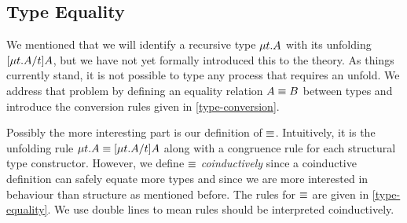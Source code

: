 \subsection{Type Equality}

We mentioned that we will identify a recursive type $\mu{t} . {A}$ with its unfolding $\lbrack{\mu{t} . {A}}/{t}\rbrack{A}$, but we have not yet formally introduced this to the theory. As things currently stand, it is not possible to type any process that requires an unfold. We address that problem by defining an equality relation $A \equiv B$ between types and introduce the conversion rules given in \cref{type-conversion}.


Possibly the more interesting part is our definition of $\equiv$. Intuitively, it is the unfolding rule $\mu{t} . {A} \equiv \lbrack{\mu{t} . {A}}/{t}\rbrack{A}$ along with a congruence rule for each structural type constructor. However, we define $\equiv$ \emph{coinductively} since a coinductive definition can safely equate more types \cite{StoneS2005} and since we are more interested in behaviour than structure as mentioned before. The rules for $\equiv$ are given in \cref{type-equality}. We use double lines to mean rules should be interpreted coinductively.


